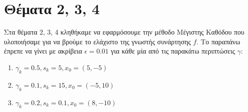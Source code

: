 \chapter{Θέματα 2, 3, 4}
Στα θέματα 2, 3, 4 κληθήκαμε να εφαρμόσουμε την μέθοδο Μέγιστης Καθόδου που υλοποιήσαμε για να βρούμε το ελάχιστο της γνωστής συνάρτησης $f$. Το παραπάνω έπρεπε να γίνει με ακρίβεια $\epsilon = 0.01$ για κάθε μία από τις παρακάτω περιπτώσεις $\gamma$:
\begin{enumerate}
    \item $\gamma_k = 0.5, s_k = 5, x_0 = (5, -5)$
    \item $\gamma_k = 0.1, s_k = 15, x_0 = (-5, 10)$
    \item $\gamma_k = 0.2, s_k = 0.1, x_0 = (8, -10)$
\end{enumerate}

